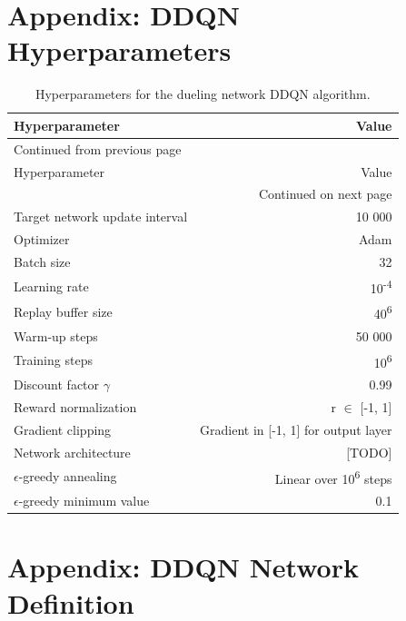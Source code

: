 \documentclass[a4paper, 12pt]{article}
\let\cite\shortcite
\begin{document}
\clearpage
\section{Appendix: DDQN Hyperparameters \label{app-rl-hyperparams}}
\label{sec:org2745411}
\setcounter{table}{0}
\begin{longtable}{lr}
\caption[Hyperparameters for the dueling network DDQN algorithm]{Hyperparameters for the dueling network DDQN algorithm.}
\\
\hline
\hline
Hyperparameter & Value\\
\hline
\endfirsthead
\multicolumn{2}{l}{Continued from previous page} \\
\hline

Hyperparameter & Value \\

\hline
\endhead
\hline\multicolumn{2}{r}{Continued on next page} \\
\endfoot
\endlastfoot
\hline
Target network update interval & 10 000\\
Optimizer & Adam \cite{kingma14_adam}\\
Batch size & 32\\
Learning rate & 10\textsuperscript{-4}\\
Replay buffer size & 40\textsuperscript{6}\\
Warm-up steps & 50 000\\
Training steps & 10\textsuperscript{6}\\
Discount factor \(\gamma\) & 0.99\\
Reward normalization & r \(\in\) [-1, 1]\\
Gradient clipping & Gradient in [-1, 1] for output layer\\
Network architecture & [TODO]\\
\hline
\(\epsilon\)-greedy annealing & Linear over 10\textsuperscript{6} steps\\
\(\epsilon\)-greedy minimum value & 0.1\\
\hline
\hline
\end{longtable}
\section{Appendix: DDQN Network Definition \label{rl-network-def}}
\label{sec:org80190e5}

\clearpage


\end{document}
